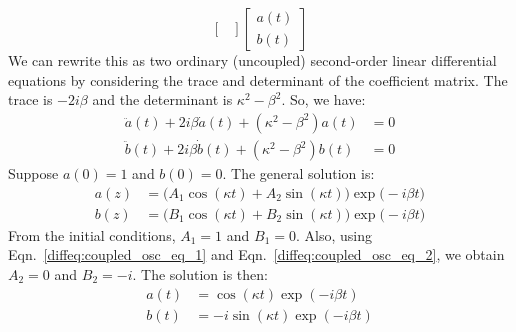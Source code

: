 \begin{fexample}
\begin{equation}
\begin{bmatrix}
                    \end{bmatrix}
                    \begin{bmatrix}
                        a(t)\\
                        b(t)
                    \end{bmatrix}
                \end{equation}
                We can rewrite this as two ordinary (uncoupled)
                second-order linear differential equations by
                considering the trace and
                determinant of the coefficient matrix. The trace is
                $-2i\beta$ and the determinant
                is $\kappa^{2}-\beta^{2}$.
                So, we have:
                \begin{subequations}
                    \begin{align}
                        \ddot{a}(t)+2i\beta\dot{a}(t)+
                        (\kappa^{2}-\beta^{2})a(t)
                        &=0\\
                        \ddot{b}(t)+2i\beta\dot{b}(t)+
                        (\kappa^{2}-\beta^{2})b(t)
                        &=0
                    \end{align}
                \end{subequations}
                Suppose $a(0)=1$ and $b(0)=0$.
                The general solution is:
                \begin{subequations}
                    \begin{align}
                        a(z)&=\big(A_{1}\cos(\kappa{t})+
                        A_{2}\sin(\kappa{t})\big)
                        \exp\big(-i\beta{t}\big)\\
                        b(z)&=\big(B_{1}\cos(\kappa{t})+
                        B_{2}\sin(\kappa{t})\big)
                        \exp\big(-i\beta{t}\big)
                    \end{align}
                \end{subequations}
                From the initial conditions, $A_{1}=1$ and
                $B_{1}=0$. Also, using
                Eqn.~\ref{diffeq:coupled_osc_eq_1} and
                Eqn.~\ref{diffeq:coupled_osc_eq_2}, we obtain
                $A_{2}=0$ and $B_{2}=-i$. The solution is then:
                \begin{align}
                    a(t)&=\cos(\kappa{t})\exp(-i\beta{t})\\
                    b(t)&=-i\sin(\kappa{t})\exp(-i\beta{t})

\end{align}
\end{fexample}

